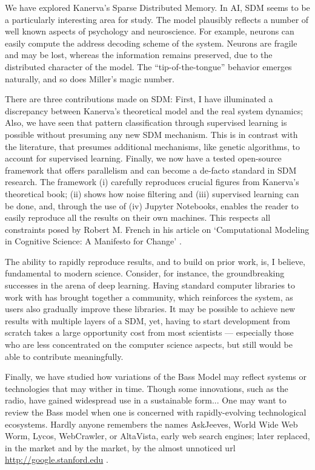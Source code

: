 


We have explored Kanerva’s Sparse Distributed Memory.   In AI, SDM seems to be a particularly interesting area for study.  The model plausibly reflects a number of well known aspects of psychology and neuroscience.  For example, neurons can easily compute the address decoding scheme of the system.  Neurons are fragile and may be lost, whereas the information remains preserved, due to the distributed character of the model.  The ``tip-of-the-tongue'' behavior emerges naturally, and so does Miller’s magic number.

There are three contributions made on SDM:  First, I have illuminated a discrepancy between Kanerva’s theoretical model and the real system dynamics; Also, we have seen that pattern classification through supervised learning is possible without presuming any new SDM mechanism. This is in contrast with the literature, that presumes additional mechanisms, like genetic algorithms, to account for supervised learning.  Finally, we now have a tested open-source framework that offers parallelism and can become a de-facto standard in SDM research.  The framework (i) carefully reproduces crucial figures from Kanerva’s theoretical book; (ii) shows how noise filtering and (iii) supervised learning can be done, and, through the use of (iv) Jupyter Notebooks, enables the reader to easily reproduce all the results on their own machines. This respects all constraints posed by Robert M. French in his article on `Computational Modeling in Cognitive Science: A Manifesto for Change' \citep{TOPS:TOPS1206}.

The ability to rapidly reproduce results, and to build on prior work, is, I believe, fundamental to modern science.  Consider, for instance, the groundbreaking successes in the arena of deep learning.  Having standard computer libraries to work with has brought together a community, which reinforces the system, as users also gradually improve these libraries. It may be possible to achieve new results with multiple layers of a SDM, yet, having to start development from scratch takes a large opportunity cost from most scientists --- especially those who are less concentrated on the computer science aspects, but still would be able to contribute meaningfully.

Finally, we have studied how variations of the Bass Model may reflect systems or technologies that may wither in time. Though some innovations, such as the radio, have gained widespread use in a sustainable form... One may want to review the Bass model when one is concerned with rapidly-evolving technological ecosystems.  Hardly anyone remembers the names AskJeeves, World Wide Web Worm, Lycos, WebCrawler, or AltaVista, early web search engines; later replaced, in the market and by the market, by the almost unnoticed url \url{http://google.stanford.edu} \citep{brin1998anatomy}.


